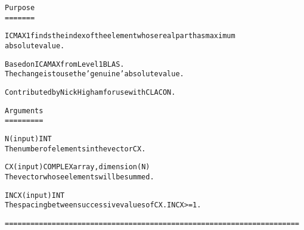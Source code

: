 \small\begin{alltt}
    Purpose   
    =======\end{alltt}\normalsize 


\small\begin{alltt}    ICMAX1 finds the index of the element whose real part has maximum   
    absolute value.\end{alltt}\normalsize 


\small\begin{alltt}    Based on ICAMAX from Level 1 BLAS.   
    The change is to use the 'genuine' absolute value.\end{alltt}\normalsize 


\small\begin{alltt}    Contributed by Nick Higham for use with CLACON.\end{alltt}\normalsize 


\small\begin{alltt}    Arguments   
    =========\end{alltt}\normalsize 


\small\begin{alltt}    N       (input) INT   
            The number of elements in the vector CX.\end{alltt}\normalsize 


\small\begin{alltt}    CX      (input) COMPLEX array, dimension (N)   
            The vector whose elements will be summed.\end{alltt}\normalsize 


\small\begin{alltt}    INCX    (input) INT   
            The spacing between successive values of CX.  INCX >= 1.\end{alltt}\normalsize 


\small\begin{alltt}   ===================================================================== 
  \end{alltt}\normalsize 
 